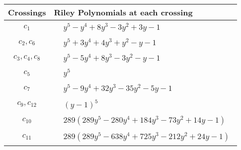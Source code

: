 \documentclass[1p]{elsarticle_modified}
\theoremstyle{definition}
\begin{document}
\begin{tabular}{m{50pt}|m{274pt}}
Crossings & \hspace{64pt}Riley Polynomials at each crossing \\
\hline $$\begin{aligned}c_{1}\end{aligned}$$&$\begin{aligned}
&y^5- y^4+8 y^3-3 y^2+3 y-1
\end{aligned}$\\
\hline $$\begin{aligned}c_{2},c_{6}\end{aligned}$$&$\begin{aligned}
&y^5+3 y^4+4 y^3+y^2- y-1
\end{aligned}$\\
\hline $$\begin{aligned}c_{3},c_{4},c_{8}\end{aligned}$$&$\begin{aligned}
&y^5-5 y^4+8 y^3-3 y^2- y-1
\end{aligned}$\\
\hline $$\begin{aligned}c_{5}\end{aligned}$$&$\begin{aligned}
&y^5
\end{aligned}$\\
\hline $$\begin{aligned}c_{7}\end{aligned}$$&$\begin{aligned}
&y^5-9 y^4+32 y^3-35 y^2-5 y-1
\end{aligned}$\\
\hline $$\begin{aligned}c_{9},c_{12}\end{aligned}$$&$\begin{aligned}
&(y-1)^5
\end{aligned}$\\
\hline $$\begin{aligned}c_{10}\end{aligned}$$&$\begin{aligned}
&289(289 y^5-280 y^4+184 y^3-73 y^2+14 y-1)
\end{aligned}$\\
\hline $$\begin{aligned}c_{11}\end{aligned}$$&$\begin{aligned}
&289(289 y^5-638 y^4+725 y^3-212 y^2+24 y-1)
\end{aligned}$\\
\hline
\end{tabular}\\~\\
\end{document}
